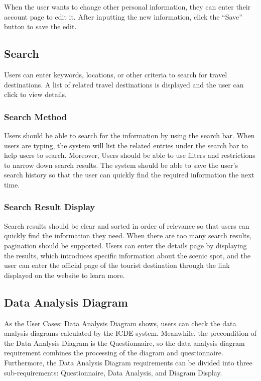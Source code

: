 \documentclass[conference]{IEEEtran}
\begin{document}
When the user wants to change other personal information, they can 
enter their account page to edit it. After inputting the new information, click 
the “Save” button to save the edit.

\subsection{ Search }

Users can enter keywords, locations, or other criteria to search for travel 
destinations.
A list of related travel destinations is displayed and the user can click to view 
details.

\subsubsection{ Search Method }

Users should be able to search for the information by using the search 
bar. When users are typing, the system will list the related entries under the 
search bar to help users to search. Moreover, Users should be able to use 
filters and restrictions to narrow down search results. The system should be 
able to save the user's search history so that the user can quickly find the 
required information the next time.

\subsubsection{ Search Result Display }

Search results should be clear and sorted in order of relevance so that 
users can quickly find the information they need. When there are too many 
search results, pagination should be supported. Users can enter the details 
page by displaying the results, which introduces specific information about 
the scenic spot, and the user can enter the official page of the tourist 
destination through the link displayed on the website to learn more.

\subsection{ Data Analysis Diagram }

As the User Cases: Data Analysis Diagram shows, users can check the 
data analysis diagrams calculated by the ICDE system. Meanwhile, the precondition of the Data Analysis Diagram is the Questionnaire, 
so the data analysis diagram requirement combines the processing of the diagram and questionnaire. Furthermore, the Data Analysis
Diagram requirements can be divided into three sub-requirements: Questionnaire, Data Analysis, and Diagram Display.
\end{document}
